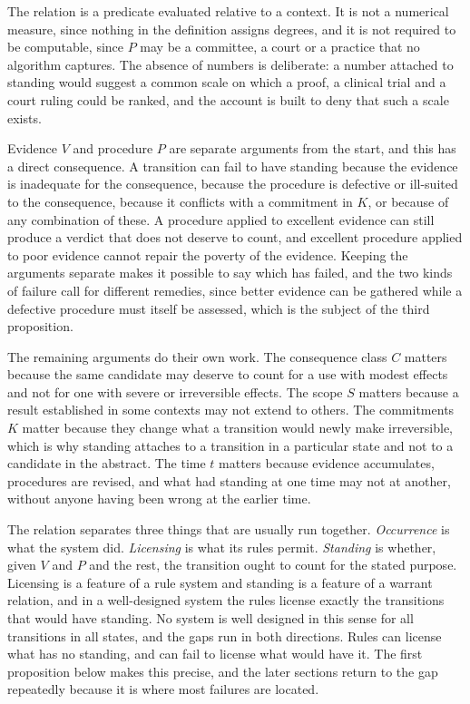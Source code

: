 The relation is a predicate evaluated relative to a context. It is not a numerical measure, since nothing in the definition assigns degrees, and it is not required to be computable, since $P$ may be a committee, a court or a practice that no algorithm captures. The absence of numbers is deliberate: a number attached to standing would suggest a common scale on which a proof, a clinical trial and a court ruling could be ranked, and the account is built to deny that such a scale exists.

Evidence $V$ and procedure $P$ are separate arguments from the start, and this has a direct consequence. A transition can fail to have standing because the evidence is inadequate for the consequence, because the procedure is defective or ill-suited to the consequence, because it conflicts with a commitment in $K$, or because of any combination of these. A procedure applied to excellent evidence can still produce a verdict that does not deserve to count, and excellent procedure applied to poor evidence cannot repair the poverty of the evidence. Keeping the arguments separate makes it possible to say which has failed, and the two kinds of failure call for different remedies, since better evidence can be gathered while a defective procedure must itself be assessed, which is the subject of the third proposition.

The remaining arguments do their own work. The consequence class $C$ matters because the same candidate may deserve to count for a use with modest effects and not for one with severe or irreversible effects. The scope $S$ matters because a result established in some contexts may not extend to others. The commitments $K$ matter because they change what a transition would newly make irreversible, which is why standing attaches to a transition in a particular state and not to a candidate in the abstract. The time $t$ matters because evidence accumulates, procedures are revised, and what had standing at one time may not at another, without anyone having been wrong at the earlier time.

The relation separates three things that are usually run together. \emph{Occurrence} is what the system did. \emph{Licensing} is what its rules permit. \emph{Standing} is whether, given $V$ and $P$ and the rest, the transition ought to count for the stated purpose. Licensing is a feature of a rule system and standing is a feature of a warrant relation, and in a well-designed system the rules license exactly the transitions that would have standing. No system is well designed in this sense for all transitions in all states, and the gaps run in both directions. Rules can license what has no standing, and can fail to license what would have it. The first proposition below makes this precise, and the later sections return to the gap repeatedly because it is where most failures are located.

